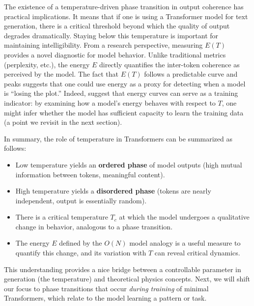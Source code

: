 \documentclass[12pt]{article}
\begin{document}

The existence of a temperature-driven phase transition in output coherence has practical implications. It means that if one is using a Transformer model for text generation, there is a critical threshold beyond which the quality of output degrades dramatically. Staying below this temperature is important for maintaining intelligibility. From a research perspective, measuring $E(T)$ provides a novel diagnostic for model behavior. Unlike traditional metrics (perplexity, etc.), the energy $E$ directly quantifies the inter-token coherence as perceived by the model. The fact that $E(T)$ follows a predictable curve and peaks suggests that one could use energy as a proxy for detecting when a model is ``losing the plot.'' Indeed, \citet{sun2025} suggest that energy curves can serve as a training indicator: by examining how a model's energy behaves with respect to $T$, one might infer whether the model has sufficient capacity to learn the training data (a point we revisit in the next section).

In summary, the role of temperature in Transformers can be summarized as follows:
\begin{itemize}
    \item Low temperature yields an \textbf{ordered phase} of model outputs (high mutual information between tokens, meaningful content).
    \item High temperature yields a \textbf{disordered phase} (tokens are nearly independent, output is essentially random).
    \item There is a critical temperature $T_c$ at which the model undergoes a qualitative change in behavior, analogous to a phase transition.
    \item The energy $E$ defined by the $O(N)$ model analogy is a useful measure to quantify this change, and its variation with $T$ can reveal critical dynamics.
\end{itemize}
This understanding provides a nice bridge between a controllable parameter in generation (the temperature) and theoretical physics concepts. Next, we will shift our focus to phase transitions that occur \emph{during training} of minimal Transformers, which relate to the model learning a pattern or task.
\end{document}
